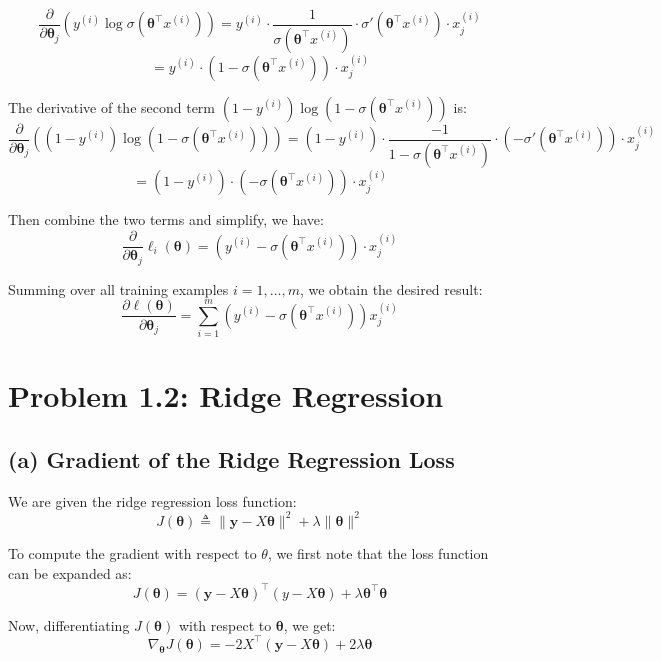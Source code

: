 \documentclass[12pt]{article}
\begin{document}
\newpage
\[
    \frac{\partial}{\partial \boldsymbol\theta_j} \left( y^{(i)} \log \sigma(\boldsymbol\theta^\top x^{(i)}) \right)
    = y^{(i)} \cdot \frac{1}{\sigma(\boldsymbol\theta^\top x^{(i)})} \cdot \sigma'(\boldsymbol\theta^\top x^{(i)}) \cdot x_j^{(i)}
\]
\[
    = y^{(i)} \cdot (1 - \sigma(\boldsymbol\theta^\top x^{(i)})) \cdot x_j^{(i)}
\]

The derivative of the second term \((1 - y^{(i)}) \log(1 - \sigma(\boldsymbol\theta^\top x^{(i)}))\) is:
\[
\frac{\partial}{\partial \boldsymbol\theta_j} \left( (1 - y^{(i)}) \log(1 - \sigma(\boldsymbol\theta^\top x^{(i)})) \right)
= (1 - y^{(i)}) \cdot \frac{-1}{1 - \sigma(\boldsymbol\theta^\top x^{(i)})} \cdot (-\sigma'(\boldsymbol\theta^\top x^{(i)})) \cdot x_j^{(i)}
\]
\[
    = (1 - y^{(i)}) \cdot (- \sigma(\boldsymbol\theta^\top x^{(i)})) \cdot x_j^{(i)}
\]

Then combine the two terms and simplify, we have:
\[
    \frac{\partial}{\partial \boldsymbol\theta_j}\ell_i(\boldsymbol\theta) = (y^{(i)} - \sigma(\boldsymbol\theta^\top x^{(i)})) \cdot x_j^{(i)}
\]

Summing over all training examples \(i = 1, \ldots, m\), we obtain the desired result:
\[
\frac{\partial \ell(\boldsymbol\theta)}{\partial \boldsymbol\theta_j} = \sum_{i=1}^{m} \left( y^{(i)} - \sigma(\boldsymbol\theta^\top x^{(i)}) \right) x_j^{(i)}
\]

\section*{Problem 1.2: Ridge Regression}

\subsection*{(a) Gradient of the Ridge Regression Loss}

We are given the ridge regression loss function:
\[
J(\boldsymbol\theta) \triangleq \| \boldsymbol y - X \boldsymbol\theta \|^2 + \lambda \|\boldsymbol\theta\|^2
\]

To compute the gradient with respect to \( \theta \), we first note that the loss function can be expanded as:
\[
J(\boldsymbol\theta) = (\boldsymbol y - X\boldsymbol\theta)^\top (y - X\boldsymbol\theta) + \lambda \boldsymbol\theta^\top \boldsymbol\theta
\]

Now, differentiating \( J(\boldsymbol\theta) \) with respect to \( \boldsymbol\theta \), we get:
\[
\nabla_{\boldsymbol\theta} J(\boldsymbol\theta) = -2X^\top(\boldsymbol y - X \boldsymbol\theta) + 2\lambda\boldsymbol\theta
\]
\end{document}
